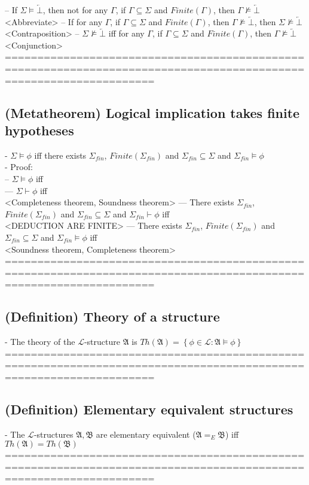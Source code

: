 \documentclass{book}
\newcommand{\inot}{\not}
\newcommand{\contr}{\overleftarrow{\bot}}
\newcommand{\set}[1]{\left\{ #1 \right\}}
\begin{document}
		-- If $\Sigma \vDash \contr$, then not for any $\Gamma$, if $\Gamma \subseteq \Sigma$ and $Finite(\Gamma)$, then $\Gamma \inot \vDash \contr$ \\ <Abbreviate>
		-- If for any $\Gamma$, if $\Gamma \subseteq \Sigma$ and $Finite(\Gamma)$, then $\Gamma \inot \vDash \contr$, then $\Sigma \inot \vDash \contr$ \\ <Contraposition>
		-- $\Sigma \inot \vDash \contr$ iff for any $\Gamma$, if $\Gamma \subseteq \Sigma$ and $Finite(\Gamma)$, then $\Gamma \inot \vDash \contr$ <Conjunction>
	===================================================================================================================
\subsection{(Metatheorem) Logical implication takes finite hypotheses} %
	- $\Sigma \vDash \phi$ iff there exists $\Sigma_{fin}$, $Finite(\Sigma_{fin})$ and $\Sigma_{fin} \subseteq \Sigma$ and $\Sigma_{fin} \vDash \phi$ \\
	- Proof: \\
		-- $\Sigma \vDash \phi$ iff \\
			--- $\Sigma \vdash \phi$ iff \\ <Completeness theorem, Soundness theorem>
			--- There exists $\Sigma_{fin}$, $Finite(\Sigma_{fin})$ and $\Sigma_{fin} \subseteq \Sigma$ and $\Sigma_{fin} \vdash \phi$ iff \\ <DEDUCTION ARE FINITE>
			--- There exists $\Sigma_{fin}$, $Finite(\Sigma_{fin})$ and $\Sigma_{fin} \subseteq \Sigma$ and $\Sigma_{fin} \vDash \phi$ iff \\ <Soundness theorem, Completeness theorem>
	===================================================================================================================
\subsection{(Definition) Theory of a structure} %
	- The theory of the $\mathcal{L}$-structure $\mathfrak{A}$ is $Th(\mathfrak{A}) = \set{\phi \in \mathcal{L}: \mathfrak{A} \vDash \phi}$ \\
	===================================================================================================================
\subsection{(Definition) Elementary equivalent structures} %
	- The $\mathcal{L}$-structures $\mathfrak{A}, \mathfrak{B}$ are elementary equivalent ($\mathfrak{A} =_E \mathfrak{B}$) iff $Th(\mathfrak{A}) = Th(\mathfrak{B})$ \\
	===================================================================================================================
\end{document}
